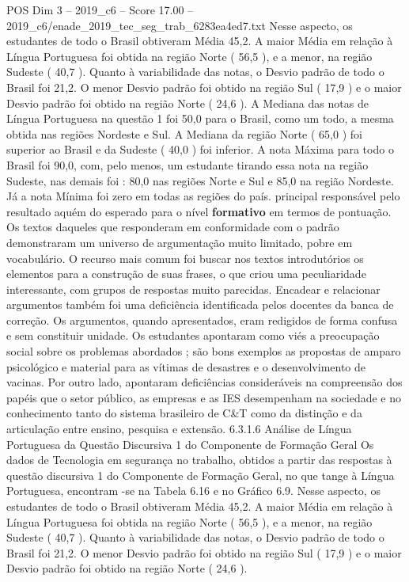 \begin{textsample}{POS Dim 3 – 2019\_c6 – Score 17.00 – 2019\_c6/enade\_2019\_tec\_seg\_trab\_6283ea4ed7.txt}
Nesse aspecto, os estudantes de todo o Brasil obtiveram Média 45,2.
A maior Média em relação à Língua Portuguesa foi obtida na região Norte ( 56,5 ), e a menor, na região Sudeste ( 40,7 ).
Quanto à variabilidade das notas, o Desvio padrão de todo o Brasil foi 21,2.
O menor Desvio padrão foi obtido na região Sul ( 17,9 ) e o maior Desvio padrão foi obtido na região Norte ( 24,6 ).
A Mediana das notas de Língua Portuguesa na questão 1 foi 50,0 para o Brasil, como um todo, a mesma obtida nas regiões Nordeste e Sul.
A Mediana da região Norte ( 65,0 ) foi superior ao Brasil e da Sudeste ( 40,0 ) foi inferior.
A nota Máxima para todo o Brasil foi 90,0, com, pelo menos, um estudante tirando essa nota na região Sudeste, nas demais foi : 80,0 nas regiões Norte e Sul e 85,0 na região Nordeste.
Já a nota Mínima foi zero em todas as regiões do país. principal responsável pelo resultado aquém do esperado para o nível \textbf{formativo} em termos de pontuação.
Os textos daqueles que responderam em conformidade com o padrão demonstraram um universo de argumentação muito limitado, pobre em vocabulário.
O recurso mais comum foi buscar nos textos introdutórios os elementos para a construção de suas frases, o que criou uma peculiaridade interessante, com grupos de respostas muito parecidas.
Encadear e relacionar argumentos também foi uma deficiência identificada pelos docentes da banca de correção.
Os argumentos, quando apresentados, eram redigidos de forma confusa e sem constituir unidade.
Os estudantes apontaram como viés a preocupação social sobre os problemas abordados ; são bons exemplos as propostas de amparo psicológico e material para as vítimas de desastres e o desenvolvimento de vacinas.
Por outro lado, apontaram deficiências consideráveis na compreensão dos papéis que o setor público, as empresas e as IES desempenham na sociedade e no conhecimento tanto do sistema brasileiro de C\&T como da distinção e da articulação entre ensino, pesquisa e extensão. 6.3.1.6 Análise de Língua Portuguesa da Questão Discursiva 1 do Componente de Formação Geral Os dados de Tecnologia em segurança no trabalho, obtidos a partir das respostas à questão discursiva 1 do Componente de Formação Geral, no que tange à Língua Portuguesa, encontram -se na Tabela 6.16 e no Gráfico 6.9.
Nesse aspecto, os estudantes de todo o Brasil obtiveram Média 45,2.
A maior Média em relação à Língua Portuguesa foi obtida na região Norte ( 56,5 ), e a menor, na região Sudeste ( 40,7 ).
Quanto à variabilidade das notas, o Desvio padrão de todo o Brasil foi 21,2.
O menor Desvio padrão foi obtido na região Sul ( 17,9 ) e o maior Desvio padrão foi obtido na região Norte ( 24,6 ).

\end{textsample}
